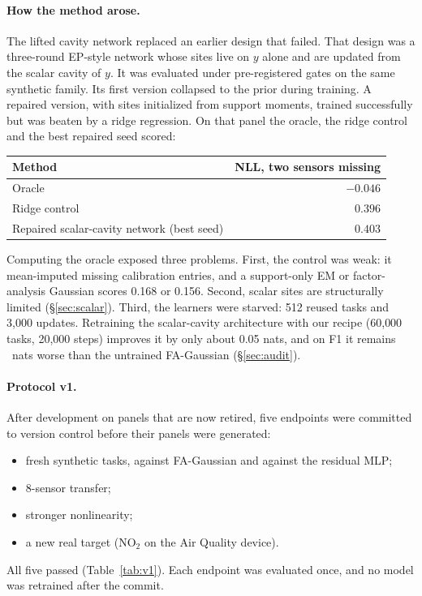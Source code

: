 \paragraph{How the method arose.}
The lifted cavity network replaced an earlier design that failed. That design was a three-round EP-style network whose
sites live on $y$ alone and are updated from the scalar cavity of $y$. It was evaluated under pre-registered gates on
the same synthetic family. Its first version collapsed to the prior during training. A repaired version, with sites
initialized from support moments, trained successfully but was beaten by a ridge regression. On that panel the
oracle, the ridge control and the best repaired seed scored:

\begin{center}\small
\begin{tabular}{lr}
\toprule
Method & NLL, two sensors missing\\
\midrule
Oracle & $-0.046$\\
Ridge control & $0.396$\\
Repaired scalar-cavity network (best seed) & $0.403$\\
\bottomrule
\end{tabular}
\end{center}

Computing the oracle exposed three problems. First, the control was weak: it mean-imputed missing calibration
entries, and a support-only EM or factor-analysis Gaussian scores 0.168 or 0.156. Second, scalar sites are
structurally limited (\S\ref{sec:scalar}). Third, the learners were starved: 512 reused tasks and 3{,}000 updates.
Retraining the scalar-cavity architecture with our recipe (60{,}000 tasks, 20{,}000 steps) improves it by only about
0.05 nats, and on F1 it remains \Ablrepocavityfreshvsfaabs\ nats worse than the untrained FA-Gaussian (\S\ref{sec:audit}).

\paragraph{Protocol v1.}
After development on panels that are now retired, five endpoints were committed to version control before their
panels were generated:
\begin{itemize}
  \item fresh synthetic tasks, against FA-Gaussian and against the residual MLP;
  \item 8-sensor transfer;
  \item stronger nonlinearity;
  \item a new real target (NO$_2$ on the Air Quality device).
\end{itemize}
All five passed (Table~\ref{tab:v1}). Each endpoint was evaluated once, and no model was retrained after the commit.

